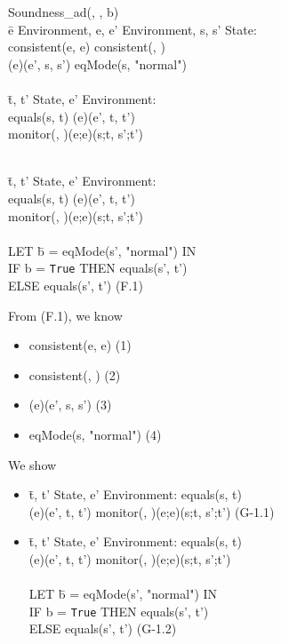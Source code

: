 \documentclass[conference]{IEEEtran}
\begin{document}
\begin{tabbing}
Soundness\_ad(, , b) 
\\ \=e  Environment, e, e'  Environment, s, s'  State:
\\\>consistent(e, e)  consistent(, )  
\\\>\textlbrackdbl \textrbrackdbl(e)(e', s, s')  eqMode(s, "normal")
\\
\\\> \=t, t'  State, e'  Environment: 
\\\>\>equals(s, t)  \textlbrackdbl \textrbrackdbl(e)(e', t, t')  
\\\>\> monitor(, )(e;e)(s;t, s';t')

\\\> \=t, t'  State, e'  Environment: 
\\\>\>equals(s, t)  \textlbrackdbl \textrbrackdbl(e)(e', t, t')  
\\\>\> monitor(, )(e;e)(s;t, s';t')
\\\> \=
\\\> LET \=b = eqMode(s', "normal") IN
\\\>\>IF b = \texttt{True} THEN equals(s', t') 
\\\>\> ELSE  equals(s', t')  \hspace*{2cm} (F.1)
\end{tabbing}

\noindent From (F.1), we know

\begin{itemize}
\item consistent(e, e)   \hspace*{4cm} (1)
\item consistent(, )  \hspace*{4.2cm} (2)
\item \textlbrackdbl \textrbrackdbl(e)(e', s, s')   \hspace*{4cm} (3)
\item eqMode(s, "normal")   \hspace*{3.52cm} (4)
\end{itemize}

\noindent We show
\begin{itemize}
\item \begin{tabbing} \=t, t'  State, e'  Environment: equals(s, t)  
\\\>\textlbrackdbl \textrbrackdbl(e)(e', t, t')  monitor(, )(e;e)(s;t, s';t')  \hspace*{0.3cm} (G-1.1)\end{tabbing}
\item \begin{tabbing} \=t, t'  State, e'  Environment: equals(s, t)  
\\\>\textlbrackdbl \textrbrackdbl(e)(e', t, t')  monitor(, )(e;e)(s;t, s';t')
\\\> \=
\\\> LET \=b = eqMode(s', "normal") IN
\\\>\>IF b = \texttt{True} THEN equals(s', t') 
\\\>\> ELSE  equals(s', t')   \hspace*{2cm} (G-1.2) \end{tabbing}
 \end{itemize}
 
\end{document}
